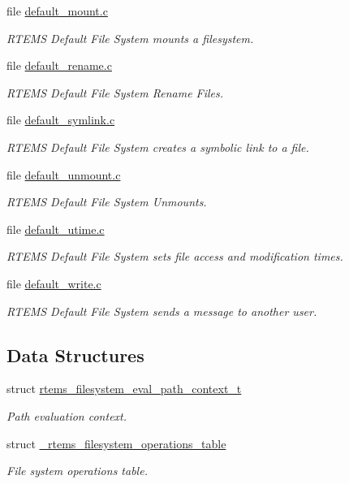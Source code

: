 \begin{DoxyCompactItemize}
file \mbox{\hyperlink{default__mount_8c}{default\+\_\+mount.\+c}}
\begin{DoxyCompactList}\small\item\em R\+T\+E\+MS Default File System mounts a filesystem. \end{DoxyCompactList}\item 
file \mbox{\hyperlink{default__rename_8c}{default\+\_\+rename.\+c}}
\begin{DoxyCompactList}\small\item\em R\+T\+E\+MS Default File System Rename Files. \end{DoxyCompactList}\item 
file \mbox{\hyperlink{default__symlink_8c}{default\+\_\+symlink.\+c}}
\begin{DoxyCompactList}\small\item\em R\+T\+E\+MS Default File System creates a symbolic link to a file. \end{DoxyCompactList}\item 
file \mbox{\hyperlink{default__unmount_8c}{default\+\_\+unmount.\+c}}
\begin{DoxyCompactList}\small\item\em R\+T\+E\+MS Default File System Unmounts. \end{DoxyCompactList}\item 
file \mbox{\hyperlink{default__utime_8c}{default\+\_\+utime.\+c}}
\begin{DoxyCompactList}\small\item\em R\+T\+E\+MS Default File System sets file access and modification times. \end{DoxyCompactList}\item 
file \mbox{\hyperlink{default__write_8c}{default\+\_\+write.\+c}}
\begin{DoxyCompactList}\small\item\em R\+T\+E\+MS Default File System sends a message to another user. \end{DoxyCompactList}\end{DoxyCompactItemize}
\subsection*{Data Structures}
\begin{DoxyCompactItemize}
\item 
struct \mbox{\hyperlink{structrtems__filesystem__eval__path__context__t}{rtems\+\_\+filesystem\+\_\+eval\+\_\+path\+\_\+context\+\_\+t}}
\begin{DoxyCompactList}\small\item\em Path evaluation context. \end{DoxyCompactList}\item 
struct \mbox{\hyperlink{struct__rtems__filesystem__operations__table}{\+\_\+rtems\+\_\+filesystem\+\_\+operations\+\_\+table}}
\begin{DoxyCompactList}\small\item\em File system operations table. \end{DoxyCompactList}\end{DoxyCompactItemize}
